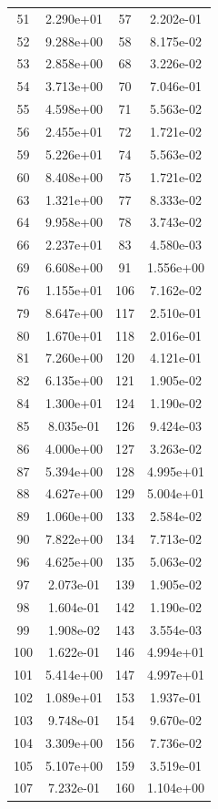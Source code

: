 \documentclass[12pt]{article}
\begin{document}
\begin{longtable}{@{}cccc@{}}
51 & 2.290e+01 & 57 & 2.202e-01 \\
52 & 9.288e+00 & 58 & 8.175e-02 \\
53 & 2.858e+00 & 68 & 3.226e-02 \\
54 & 3.713e+00 & 70 & 7.046e-01 \\
55 & 4.598e+00 & 71 & 5.563e-02 \\
56 & 2.455e+01 & 72 & 1.721e-02 \\
59 & 5.226e+01 & 74 & 5.563e-02 \\
60 & 8.408e+00 & 75 & 1.721e-02 \\
63 & 1.321e+00 & 77 & 8.333e-02 \\
64 & 9.958e+00 & 78 & 3.743e-02 \\
66 & 2.237e+01 & 83 & 4.580e-03 \\
69 & 6.608e+00 & 91 & 1.556e+00 \\
76 & 1.155e+01 & 106 & 7.162e-02 \\
79 & 8.647e+00 & 117 & 2.510e-01 \\
80 & 1.670e+01 & 118 & 2.016e-01 \\
81 & 7.260e+00 & 120 & 4.121e-01 \\
82 & 6.135e+00 & 121 & 1.905e-02 \\
84 & 1.300e+01 & 124 & 1.190e-02 \\
85 & 8.035e-01 & 126 & 9.424e-03 \\
86 & 4.000e+00 & 127 & 3.263e-02 \\
87 & 5.394e+00 & 128 & 4.995e+01 \\
88 & 4.627e+00 & 129 & 5.004e+01 \\
89 & 1.060e+00 & 133 & 2.584e-02 \\
90 & 7.822e+00 & 134 & 7.713e-02 \\
96 & 4.625e+00 & 135 & 5.063e-02 \\
97 & 2.073e-01 & 139 & 1.905e-02 \\
98 & 1.604e-01 & 142 & 1.190e-02 \\
99 & 1.908e-02 & 143 & 3.554e-03 \\
100 & 1.622e-01 & 146 & 4.994e+01 \\
101 & 5.414e+00 & 147 & 4.997e+01 \\
102 & 1.089e+01 & 153 & 1.937e-01 \\
103 & 9.748e-01 & 154 & 9.670e-02 \\
104 & 3.309e+00 & 156 & 7.736e-02 \\
105 & 5.107e+00 & 159 & 3.519e-01 \\
107 & 7.232e-01 & 160 & 1.104e+00 \\

\end{longtable}
\end{document}
